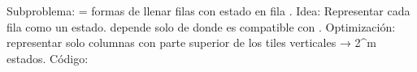 \markdownRendererUlItem Subproblema:  = formas de llenar filas  con estado  en fila .\markdownRendererUlItemEnd 
\markdownRendererUlEndTight \markdownRendererInterblockSeparator
{}Idea:\markdownRendererInterblockSeparator
{}\markdownRendererUlBeginTight
\markdownRendererUlItem Representar cada fila como un estado.\markdownRendererUlItemEnd 
\markdownRendererUlItem {} depende solo de  donde  es compatible con .\markdownRendererUlItemEnd 
\markdownRendererUlItem Optimización: representar solo columnas con parte superior de los tiles verticales → 2^m estados.\markdownRendererUlItemEnd 
\markdownRendererUlEndTight \markdownRendererInterblockSeparator
{}Código:\markdownRendererInterblockSeparator
{}
\markdownRendererSectionEnd 
\markdownRendererSectionEnd \markdownRendererDocumentEnd